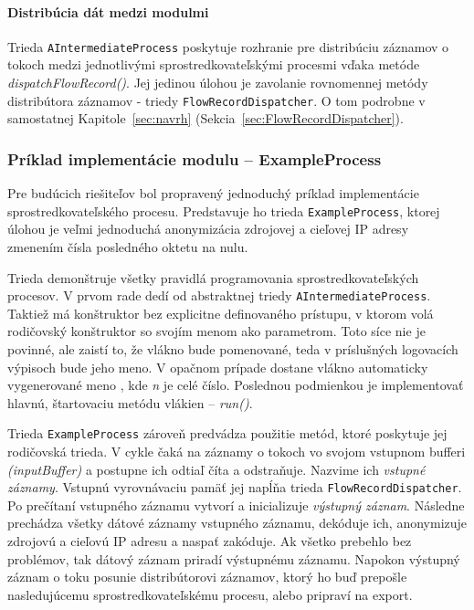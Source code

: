 \paragraph{Distribúcia dát medzi modulmi} 
Trieda \verb|AIntermediateProcess| poskytuje rozhranie pre distribúciu záznamov o tokoch medzi 
jednotlivými sprostredkovateľskými procesmi vďaka metóde \emph{dispatchFlowRecord()}. 
Jej jedinou úlohou je zavolanie rovnomennej metódy distribútora záznamov - triedy \verb|FlowRecordDispatcher|.
O tom podrobne v samostatnej Kapitole~\ref{sec:navrh} (Sekcia~\ref{sec:FlowRecordDispatcher}).



\subsubsection{Príklad implementácie modulu -- ExampleProcess}

Pre budúcich riešiteľov bol propravený jednoduchý príklad implementácie sprostredkovateľského procesu.
Predstavuje ho trieda \verb|ExampleProcess|, ktorej úlohou je veľmi jednoduchá anonymizácia zdrojovej a 
cieľovej IP adresy zmenením čísla posledného oktetu na nulu. 

Trieda demonštruje všetky pravidlá programovania sprostredkovateľských procesov. V prvom rade dedí od 
abstraktnej triedy \verb|AIntermediateProcess|. Taktiež má konštruktor bez explicitne definovaného 
prístupu, v ktorom volá rodičovský konštruktor so svojím menom ako parametrom. Toto síce nie je povinné,
ale zaistí to, že vlákno bude pomenované, teda v príslušných logovacích výpisoch bude jeho meno.
V opačnom prípade dostane vlákno automaticky vygenerované meno , kde \emph{n} je celé 
číslo. Poslednou podmienkou je implementovať hlavnú, štartovaciu metódu vlákien -- \emph{run()}.

Trieda \verb|ExampleProcess| zároveň predvádza použitie metód, ktoré poskytuje jej rodičovská trieda.
V cykle čaká na záznamy o tokoch vo svojom vstupnom bufferi \emph{(inputBuffer)} a postupne ich odtiaľ 
číta a odstraňuje. Nazvime ich 
\emph{vstupné záznamy}. Vstupnú vyrovnávaciu pamäť jej napĺňa trieda \verb|FlowRecordDispatcher|. Po 
prečítaní 
vstupného záznamu vytvorí a inicializuje \emph{výstupný záznam}. Následne prechádza všetky dátové záznamy
vstupného záznamu, dekóduje ich, anonymizuje zdrojovú a cieľovú IP adresu a naspať zakóduje. Ak všetko 
prebehlo bez problémov, tak dátový záznam priradí výstupnému záznamu. Napokon výstupný záznam o toku 
posunie distribútorovi záznamov, ktorý ho buď prepošle 
nasledujúcemu sprostredkovateľskému procesu, alebo pripraví na export.




